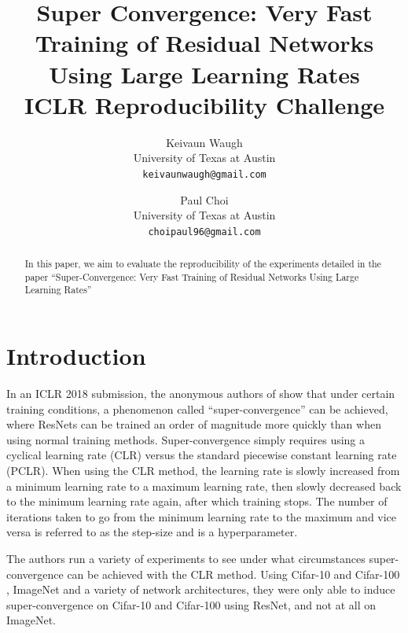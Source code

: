 \documentclass[10pt,twocolumn,letterpaper]{article}
\begin{document}
\title{
    Super Convergence: Very Fast Training of Residual Networks Using Large
    Learning Rates\\
    \large ICLR Reproducibility Challenge}

\author{Keivaun Waugh\\
University of Texas at Austin\\
{\tt\small keivaunwaugh@gmail.com}
\and
Paul Choi\\
University of Texas at Austin\\
{\tt\small choipaul96@gmail.com}
}

\maketitle

\begin{abstract}
In this paper, we aim to evaluate the reproducibility of the experiments
    detailed in the paper ``Super-Convergence: Very Fast Training of Residual
    Networks Using Large Learning Rates'' \cite{SuperConvergence}
\end{abstract}

\section{Introduction}
In an ICLR 2018 submission, the anonymous authors of \cite{SuperConvergence}
show that under certain training conditions, a phenomenon called
``super-convergence'' can be achieved, where ResNets \cite{ResNet} can be
trained an order of magnitude more quickly than when using normal training
methods.  Super-convergence simply requires using a cyclical learning rate
(CLR) versus the standard piecewise constant learning rate (PCLR). When using
the CLR method, the learning rate is slowly increased from a minimum learning
rate to a maximum learning rate, then slowly decreased back to the minimum
learning rate again, after which training stops. The number of iterations taken
to go from the minimum learning rate to the maximum and vice versa is referred
to as the step-size and is a hyperparameter.

The authors run a variety of experiments to see under what circumstances
super-convergence can be achieved with the CLR method. Using Cifar-10 and
Cifar-100 \cite{Cifar}, ImageNet \cite{ImageNet} and a variety of network
architectures, they were only able to induce super-convergence on Cifar-10 and
Cifar-100 using ResNet, and not at all on ImageNet.
\end{document}
